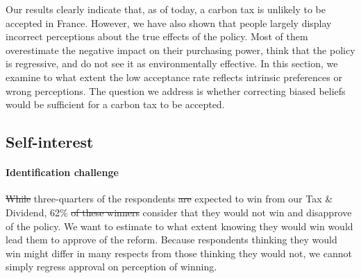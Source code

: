 \documentclass[12pt]{article} %
\providecommand{\DIFaddtex}[1]{{\protect\color{blue}\uwave{#1}}} %
\providecommand{\DIFdeltex}[1]{{\protect\color{red}\sout{#1}}}                      %
\providecommand{\DIFaddbegin}{} %
\providecommand{\DIFaddend}{} %
\providecommand{\DIFdelbegin}{} %
\providecommand{\DIFdelend}{} %
\providecommand{\DIFadd}[1]{\texorpdfstring{\DIFaddtex{#1}}{#1}} %
\providecommand{\DIFdel}[1]{\texorpdfstring{\DIFdeltex{#1}}{}} %
\newcommand{\DIFscaledelfig}{0.5}
\newlength{\DIFdelgraphicswidth} %
\newlength{\DIFdelgraphicsheight} %
\newcommand{\DIFaddincludegraphics}[2][]{{\color{blue}\fbox{\DIFOincludegraphics[#1]{#2}}}} %
\newcommand{\DIFdelincludegraphics}[2][]{%
\sbox{\DIFdelgraphicsbox}{\DIFOincludegraphics[#1]{#2}}%
\settoboxwidth{\DIFdelgraphicswidth}{\DIFdelgraphicsbox} %
\settoboxtotalheight{\DIFdelgraphicsheight}{\DIFdelgraphicsbox} %
\scalebox{\DIFscaledelfig}{%
\parbox[b]{\DIFdelgraphicswidth}{\usebox{\DIFdelgraphicsbox}\\[-\baselineskip] \rule{\DIFdelgraphicswidth}{0em}}\llap{\resizebox{\DIFdelgraphicswidth}{\DIFdelgraphicsheight}{%
\setlength{\unitlength}{\DIFdelgraphicswidth}%
\begin{picture}(1,1)%
\thicklines\linethickness{2pt} %
{\color[rgb]{1,0,0}\put(0,0){\framebox(1,1){}}}%
{\color[rgb]{1,0,0}\put(0,0){\line( 1,1){1}}}%
{\color[rgb]{1,0,0}\put(0,1){\line(1,-1){1}}}%
\end{picture}%
}\hspace*{3pt}}} %
} %
\DeclareRobustCommand{\DIFaddbegin}{\DIFOaddbegin \let\includegraphics\DIFaddincludegraphics} %
\DeclareRobustCommand{\DIFaddend}{\DIFOaddend \let\includegraphics\DIFOincludegraphics} %
\DeclareRobustCommand{\DIFdelbegin}{\DIFOdelbegin \let\includegraphics\DIFdelincludegraphics} %
\DeclareRobustCommand{\DIFdelend}{\DIFOaddend \let\includegraphics\DIFOincludegraphics} %
\begin{document}
Our results clearly indicate that, as of today, a carbon tax is unlikely to be accepted in France. However, we have also shown that people largely display incorrect perceptions about the true effects of the policy. Most of them overestimate the negative impact on their purchasing power, think that the policy is regressive, and do not see it as environmentally effective. In this section, we examine to what extent the low acceptance rate reflects intrinsic preferences or wrong perceptions. The question we address is whether correcting biased beliefs would be sufficient for a carbon tax to be accepted. 

    \subsection{Self-interest}

\paragraph{Identification challenge}

\DIFdelbegin \DIFdel{While }\DIFdelend %
\DIFaddbegin \DIFadd{Among the }\DIFaddend three-quarters of the respondents \DIFdelbegin \DIFdel{are }\DIFdelend expected to win from our Tax \& Dividend, 62\% \DIFdelbegin \DIFdel{of these winners }\DIFdelend \DIFaddbegin \DIFadd{both }\DIFaddend consider that they would not win and disapprove of the policy. We want to estimate to what extent knowing they would win would lead them to approve of the reform. Because respondents thinking they would win might differ in many respects from those thinking they would not, we cannot simply regress approval on perception of winning. 
\end{document}
